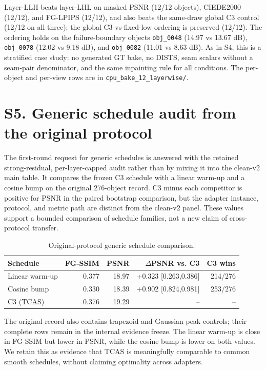 \documentclass[10pt]{article}
\begin{document}
Layer-LLH beats layer-LHL on masked PSNR (12/12 objects), CIEDE2000
(12/12), and FG-LPIPS (12/12), and also beats the same-draw global C3 control
(12/12 on all three); the global C3-vs-fixed-low ordering is preserved
(12/12). The ordering holds on the failure-boundary objects
\texttt{obj\_0048} (14.97 vs 13.67 dB), \texttt{obj\_0078} (12.02 vs
9.18 dB), and \texttt{obj\_0082} (11.01 vs 8.63 dB). As in S4, this is a
stratified case study: no generated GT bake, no DISTS, seam scalars without
a seam-pair denominator, and the same inpainting rule for all conditions.
The per-object and per-view rows are in
\texttt{cpu\_bake\_12\_layerwise/}.

\section{S5. Generic schedule audit from the original protocol}

The first-round request for generic schedules is answered with the retained
strong-residual, per-layer-capped audit rather than by mixing it into the
clean-v2 main table. It compares the frozen C3 schedule with a linear warm-up
and a cosine bump on the original 276-object record. C3 minus each competitor
is positive for PSNR in the paired bootstrap comparison, but the adapter
instance, protocol, and metric path are distinct from the clean-v2 panel.
These values support a bounded comparison of schedule families, not a new
claim of cross-protocol transfer.

\begin{table}[h]
\centering\scriptsize
\caption{Original-protocol generic schedule comparison.}
\begin{tabular}{lrrrr}
\toprule
Schedule & FG-SSIM & PSNR & $\Delta$PSNR vs. C3 & C3 wins \\
\midrule
Linear warm-up & 0.377 & 18.97 & +0.323 [0.263,0.386] & 214/276 \\
Cosine bump & 0.330 & 18.39 & +0.902 [0.824,0.981] & 253/276 \\
C3 (TCAS) & 0.376 & 19.29 & -- & -- \\
\bottomrule
\end{tabular}
\end{table}

The original record also contains trapezoid and Gaussian-peak controls; their
complete rows remain in the internal evidence freeze. The linear warm-up is
close in FG-SSIM but lower in PSNR, while the cosine bump is lower on both
values. We retain this as evidence that TCAS is meaningfully comparable to
common smooth schedules, without claiming optimality across adapters.
\end{document}
